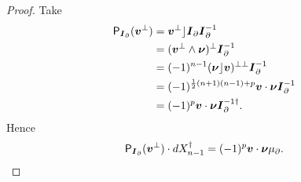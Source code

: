 \begin{proof}
Take
\begin{align*}
\mathsf{P}_{\boldsymbol{I}_\partial}(\boldsymbol{v}^\perp) &= \boldsymbol{v}^\perp \rfloor \boldsymbol{I}_\partial \boldsymbol{I}_\partial^{-1}\\
    &= (\boldsymbol{v}^\perp \wedge \boldsymbol{\nu})^\perp \boldsymbol{I}_\partial^{-1}\\
    &= (-1)^{n-1} (\boldsymbol{\nu} \rfloor \boldsymbol{v})^{\perp \perp} \boldsymbol{I}_\partial^{-1}\\
    &= (-1)^{\frac{1}{2}(n+1)(n-1)+p} \boldsymbol{v}\cdot \boldsymbol{\nu} \boldsymbol{I}_\partial^{-1}\\
    &= (-1)^p \boldsymbol{v} \cdot \boldsymbol{\nu} \boldsymbol{I}_\partial^{-1 \dagger}.
\end{align*}
Hence 
\[
\mathsf{P}_{\boldsymbol{I}_\partial}(\boldsymbol{v}^\perp) \cdot dX_{n-1}^\dagger =(-1)^p \boldsymbol{v} \cdot \boldsymbol{\nu} \mu_\partial.
\]
\end{proof}

